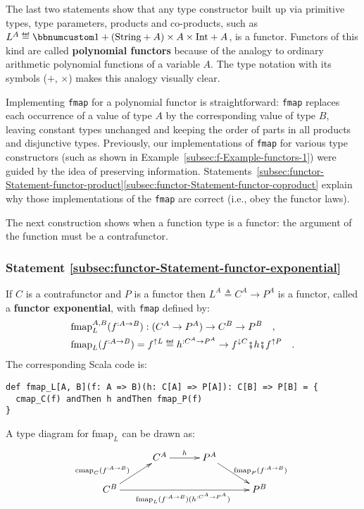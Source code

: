 The last two statements show that any type constructor built up via
primitive types, type parameters, products and co-products, such as
$L^{A}\triangleq\bbnum 1+(\text{String}+A)\times A\times\text{Int}+A$,
is a functor. Functors of this kind are called \textbf{polynomial
functors} because of the analogy to ordinary arithmetic polynomial
functions of a variable $A$. The type notation with its symbols ($+$,
$\times$) makes this analogy visually clear. 

Implementing \lstinline!fmap! for a polynomial functor is straightforward:
\lstinline!fmap! replaces each occurrence of a value of type $A$
by the corresponding value of type $B$, leaving constant types unchanged
and keeping the order of parts in all products and disjunctive types.
Previously, our implementations of \lstinline!fmap! for various type
constructors (such as shown in Example~\ref{subsec:f-Example-functors-1})
were guided by the idea of preserving information. Statements~\ref{subsec:functor-Statement-functor-product}\textendash \ref{subsec:functor-Statement-functor-coproduct}
explain why those implementations of the \lstinline!fmap! are correct
(i.e., obey the functor laws).

The next construction shows when a function type is a functor: the
argument of the function must be a contrafunctor.

\subsubsection{Statement \label{subsec:functor-Statement-functor-exponential}\ref{subsec:functor-Statement-functor-exponential}}

If $C$ is a contrafunctor and $P$ is a functor then $L^{A}\triangleq C^{A}\rightarrow P^{A}$
is a functor, called a \textbf{functor
exponential}, with \lstinline!fmap! defined by:
\begin{align}
 & \text{fmap}_{L}^{A,B}(f^{:A\rightarrow B}):(C^{A}\rightarrow P^{A})\rightarrow C^{B}\rightarrow P^{B}\quad,\nonumber \\
 & \text{fmap}_{L}(f^{:A\rightarrow B})=f^{\uparrow L}\triangleq h^{:C^{A}\rightarrow P^{A}}\rightarrow f^{\downarrow C}\bef h\bef f^{\uparrow P}\quad.\label{eq:f-functor-exponential-def-of-fmap}
\end{align}
The corresponding Scala code is:
\begin{lstlisting}
def fmap_L[A, B](f: A => B)(h: C[A] => P[A]): C[B] => P[B] = {
  cmap_C(f) andThen h andThen fmap_P(f)
}
\end{lstlisting}
A type diagram for $\text{fmap}_{L}$ can be drawn as:
\[
\xymatrix{\xyScaleY{1.5pc}\xyScaleX{2.5pc} & C^{A}\ar[r]\sp(0.5){h} & P^{A}\ar[rd]\sp(0.6){\ \text{fmap}_{P}(f^{:A\rightarrow B})\ }\\
C^{B}\ar[ru]\sp(0.4){\text{cmap}_{C}(f^{:A\rightarrow B})\ ~~}\ar[rrr]\sb(0.5){\text{fmap}_{L}(f^{:A\rightarrow B})(h^{:C^{A}\rightarrow P^{A}})\ } &  &  & P^{B}
}
\]



